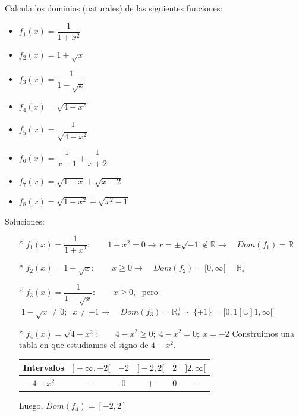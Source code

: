 {		
		\begin{ejre}
			Calcula los dominios (naturales) de las siguientes funciones:
			
		
		
		\begin{multicols}{2} 
		\begin{itemize}
		\item $f_1(x)=\dfrac 1 {1+x^2}$
		\item $f_2(x)=1+\sqrt x$
		\item $f_3(x)=\dfrac 1 {1-\sqrt x}$
		\item $f_4(x)=\sqrt{4-x^2}$
		\item  $f_5(x)=\dfrac 1 {\sqrt{4-x^2}}$
		\item $f_6(x)=\dfrac {1}{x-1} + \dfrac {1}{x+2} $
		\item $f_7(x)=\sqrt {1-x}+\sqrt {x-2}$
		\item $f_8(x)=\sqrt{1-x^2}+\sqrt{x^2-1}$
		\end{itemize}
		\end{multicols}
		

			
		\end{ejre}
		
		\begin{proofw}\renewcommand{\qedsymbol}{$\diamond$}
		
		Soluciones:
		
		\begin{itemize}
			\item [*]$f_1(x)=\dfrac 1 {1+x^2}:\qquad 1+x^2= 0 \to x=\pm \sqrt{-1} \notin \mathbb R \to \quad Dom(f_1)=\mathbb R $ 
			\item [*]$f_2(x)=1+\sqrt x: \qquad x\ge0 \to \quad Dom(f_2)=[0,\infty[=\mathbb R^+_*$
			\item [*]$f_3(x)=\dfrac 1 {1-\sqrt x}: \qquad x\ge 0,\;  $ pero $\; 1-\sqrt x \neq 0; \; \; x\neq \pm 1 \to \quad Dom(f_3)=\mathbb R^+_* \sim \{ \pm 1 \}= [0,1[ \cup ]1,\infty[$
			\item [*]$f_4(x)=\sqrt{4-x^2}: \qquad4-x^2\ge 0;\; 4-x^2=0; \; x=\pm 2$ Construimos una tabla en que estudiamos el signo de $4-x^2$.
			
		
			\begin{table}[H]
			\centering
			\begin{tabular}{|c|c|c|c|c|c|}
				\hline
				 Intervalos & $]-\infty,-2[$  & $-2$ & $]-2,2[$ & $2$ & $]2,\infty[$  \\ \hline
				 $4-x^2$& $-$ & 0 & + & 0 & $-$\\ \hline
			\end{tabular}
			\end{table}
			Luego, $Dom(f_4)=[-2,2]$
		

\end{itemize}
\end{proofw}}
